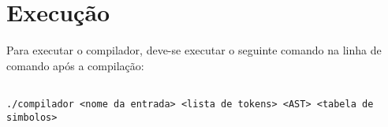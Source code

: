 \documentclass[12pt,a4paper,final]{article}
\begin{document}
\section*{Execução}
Para executar o compilador, deve-se executar o seguinte comando na linha de comando após a compilação:

\begin{lstlisting}

./compilador <nome da entrada> <lista de tokens> <AST> <tabela de simbolos>

\end{lstlisting}
\end{document}

